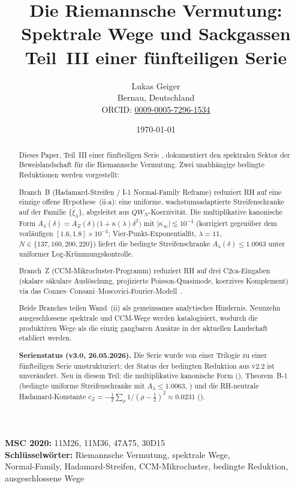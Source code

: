 \documentclass[12pt,a4paper]{article}
\title{Die Riemannsche Vermutung: Spektrale Wege und Sackgassen\\[4pt]
\large Teil~III einer fünfteiligen Serie}
\author{Lukas Geiger\\
\small Bernau, Deutschland\\
\small ORCID: \href{https://orcid.org/0009-0005-7296-1534}{0009-0005-7296-1534}}
\date{\today}
\theoremstyle{definition}
\theoremstyle{remark}
\begin{document}
\overfullrule=0pt
\maketitle

\begin{abstract}\footnotesize
Dieses Paper, Teil~III einer fünfteiligen Serie
\cite{Geiger2026partI,Geiger2026partII,Geiger2026partIV,Geiger2026partV},
dokumentiert den spektralen Sektor der Beweislandschaft für die
Riemannsche Vermutung. Zwei unabhängige bedingte Reduktionen werden
vorgestellt:

Branch~B (Hadamard-Streifen / I-1 Normal-Family Reframe) reduziert RH auf
eine einzige offene Hypothese~(ii-a): eine uniforme, wachstumsadaptierte
Streifenschranke auf der Familie $\{\hat\xi_\lambda\}$, abgeleitet aus
$QW_N$-Koerzivität. Die multiplikative kanonische Form
$A_\lambda(\delta) = A_\Xi(\delta)\bigl(1+\kappa(\lambda)\delta^2\bigr)$
mit $|\kappa_\infty|\lesssim 10^{-4}$ (korrigiert gegenüber dem
vorläufigen $[1.6,1.8]\times10^{-3}$; Vier-Punkt-Exponentialfit, $\lambda=11$,
$N\in\{137,160,200,220\}$) liefert die bedingte Streifenschranke
$A_\lambda(\delta) \leq 1.0063$ unter uniformer Log-Krümmungskontrolle.

Branch~Z (CCM-Mikrocluster-Programm) reduziert RH auf drei C2ca-Eingaben
(skalare säkulare Auslöschung, projizierte Poisson-Quasimode, koerzives
Komplement) via das Connes--Consani--Moscovici-Fourier-Modell~\cite{ConnesMoscovici2023}.

Beide Branches teilen Wand~(ii) als gemeinsames analytisches Hindernis.
Neunzehn ausgeschlossene spektrale und CCM-Wege werden katalogisiert,
wodurch die produktiven Wege als die einzig gangbaren Ansätze in der
aktuellen Landschaft etabliert werden.

\medskip\noindent
\textbf{Serienstatus (v3.0, 26.05.2026).}
Die Serie wurde von einer Trilogie zu einer fünfteiligen Serie
umstrukturiert; der Status der bedingten Reduktion aus v2.2 ist
unverändert. Neu in diesem Teil: die multiplikative kanonische Form
(), Theorem~B-1 (bedingte uniforme
Streifenschranke mit $A_\lambda \leq 1.0063$, ) und die
RH-neutrale Hadamard-Konstante
$c_\Xi = -\tfrac{1}{2}\sum_\rho 1/(\rho-\tfrac{1}{2})^2 \approx 0.0231$
().
\end{abstract}

{\footnotesize
\noindent\textbf{MSC 2020:} 11M26, 11M36, 47A75, 30D15\\
\textbf{Schlüsselwörter:} Riemannsche Vermutung, spektrale Wege,\\
Normal-Family, Hadamard-Streifen, CCM-Mikrocluster, bedingte Reduktion,\\
ausgeschlossene Wege
}
\end{document}
